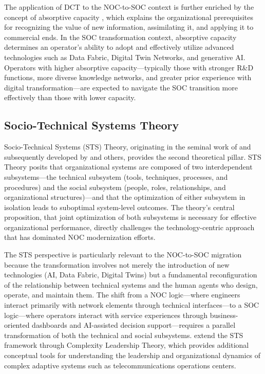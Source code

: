 \documentclass[12pt,a4paper]{article}
\begin{document}
The application of DCT to the NOC-to-SOC context is further enriched by the concept of absorptive capacity \citep{cohen1990absorptive}, which explains the organizational prerequisites for recognizing the value of new information, assimilating it, and applying it to commercial ends. In the SOC transformation context, absorptive capacity determines an operator's ability to adopt and effectively utilize advanced technologies such as Data Fabric, Digital Twin Networks, and generative AI. Operators with higher absorptive capacity---typically those with stronger R\&D functions, more diverse knowledge networks, and greater prior experience with digital transformation---are expected to navigate the SOC transition more effectively than those with lower capacity.

\subsection{Socio-Technical Systems Theory}

Socio-Technical Systems (STS) Theory, originating in the seminal work of \citet{trist1951social} and subsequently developed by \citet{bostrom1977mis} and others, provides the second theoretical pillar. STS Theory posits that organizational systems are composed of two interdependent subsystems---the technical subsystem (tools, techniques, processes, and procedures) and the social subsystem (people, roles, relationships, and organizational structures)---and that the optimization of either subsystem in isolation leads to suboptimal system-level outcomes. The theory's central proposition, that joint optimization of both subsystems is necessary for effective organizational performance, directly challenges the technology-centric approach that has dominated NOC modernization efforts.

The STS perspective is particularly relevant to the NOC-to-SOC migration because the transformation involves not merely the introduction of new technologies (AI, Data Fabric, Digital Twins) but a fundamental reconfiguration of the relationship between technical systems and the human agents who design, operate, and maintain them. The shift from a NOC logic---where engineers interact primarily with network elements through technical interfaces---to a SOC logic---where operators interact with service experiences through business-oriented dashboards and AI-assisted decision support---requires a parallel transformation of both the technical and social subsystems. \citet{uhl2007complexity} extend the STS framework through Complexity Leadership Theory, which provides additional conceptual tools for understanding the leadership and organizational dynamics of complex adaptive systems such as telecommunications operations centers.
\end{document}
